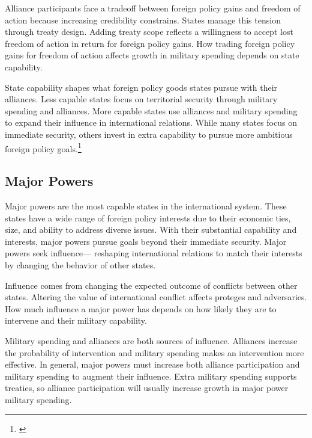 \documentclass[12pt]{article}
\begin{document}
Alliance participants face a tradeoff between foreign policy gains and freedom of action because increasing credibility constrains. 
States manage this tension through treaty design. 
Adding treaty scope reflects a willingness to accept lost freedom of action in return for foreign policy gains. 
How trading foreign policy gains for freedom of action affects growth in military spending depends on state capability. 


State capability shapes what foreign policy goods states pursue with their alliances. 
Less capable states focus on territorial security through military spending and alliances. 
More capable states use alliances and military spending to expand their influence in international relations. 
While many states focus on immediate security, others invest in extra capability to pursue more ambitious foreign policy goals.\footnote{\citep{Fordham2011, MarkowitzFariss2017}} 


\subsection{Major Powers} 


Major powers are the most capable states in the international system. 
These states have a wide range of foreign policy interests due to their economic ties, size, and ability to address diverse issues. 
With their substantial capability and interests, major powers pursue goals beyond their immediate security. 
Major powers seek influence--- reshaping international relations to match their interests by changing the behavior of other states. 


Influence comes from changing the expected outcome of conflicts between other states.
Altering the value of international conflict affects proteges and adversaries.  
How much influence a major power has depends on how likely they are to intervene and their military capability. 


Military spending and alliances are both sources of influence. 
Alliances increase the probability of intervention and military spending makes an intervention more effective. 
In general, major powers must increase both alliance participation and military spending to augment their influence.
Extra military spending supports treaties, so alliance participation will usually increase growth in major power military spending. 
\end{document}
